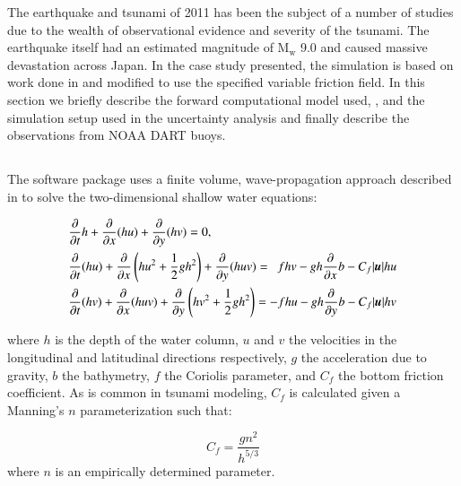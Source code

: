 The \tohoku earthquake and tsunami of 2011 has been the subject of a number of studies due to the wealth of observational evidence and severity of the tsunami.  The earthquake itself had an estimated magnitude of $\text{M}_\text{w}$ 9.0 and caused massive devastation across Japan.  In the case study presented, the simulation is based on work done in \cite{MacInnes:2013cr} and modified to use the specified variable friction field.
In this section we briefly describe the forward computational model used, \geoclaw, and the 
simulation setup used in the uncertainty analysis and finally describe
the observations from NOAA DART buoys.



\subsection{\geoclaw} \label{ssub:geoclaw}

The \geoclaw software package uses a finite volume, wave-propagation approach described in \cite{LeVeque:1997eg} to solve the two-dimensional shallow water equations:

\begin{equation} \label{eq:swe}
    \begin{aligned}
    &\pd{}{t} h + \pd{}{x} (hu) + \pd{}{y} (hv) = 0, \\
    &\pd{}{t}(hu) + \pd{}{x} \left(hu^2 + \frac{1}{2} g h^2 \right ) + \pd{}{y} (huv) = ~~ fhv - gh \pd{}{x} b - C_f |\vec{u}| hu \\
    &\pd{}{t} (hv) + \pd{}{x} (huv) + \pd{}{y} \left (hv^2 + \frac{1}{2} gh^2 \right) = -fhu - gh \pd{}{y} b - C_f |\vec{u}| hv
    \end{aligned}
\end{equation}

where $h$ is the depth of the water column, $u$ and $v$ the velocities in the 
longitudinal and latitudinal directions respectively, $g$ the acceleration due 
to gravity, $b$ the bathymetry, $f$ the Coriolis parameter, and $C_f$ the bottom 
friction coefficient.  As is common in tsunami modeling, $C_f$ is calculated 
given a Manning's $n$ parameterization such that:

\begin{equation}
    C_f = \frac{g n^2}{h^{5/3}}
\label{eq:coef}
\end{equation}
where $n$ is an empirically determined parameter.  

